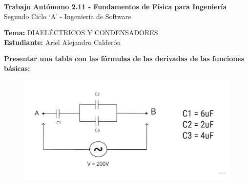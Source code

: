 \documentclass[answers]{exam} %
\begin{document}
\begin{center}
	\large\textbf{Trabajo Autónomo 2.11 - Fundamentos de Física para Ingeniería}\\[1em]
	\large Segundo Ciclo \enquote*{A} - Ingeniería de Software\\[1em]
\end{center}

\vspace{0.5cm}
\noindent
\large\textbf{Tema:} DIAELÉCTRICOS Y CONDENSADORES \\
\large\textbf{Estudiante:} Ariel Alejandro Calderón
\vspace{0.5cm}

\begin{questions}

	\question \large\textbf{Presentar una tabla con las fórmulas de las derivadas de las funciones básicas:}
	\begin{center}
		\begin{figure}
			\includegraphics[width=1\textwidth]{./public/g1.png}
		\end{figure}
	\end{center}

	\vspace{0.5cm}
\end{questions}
\end{document}
